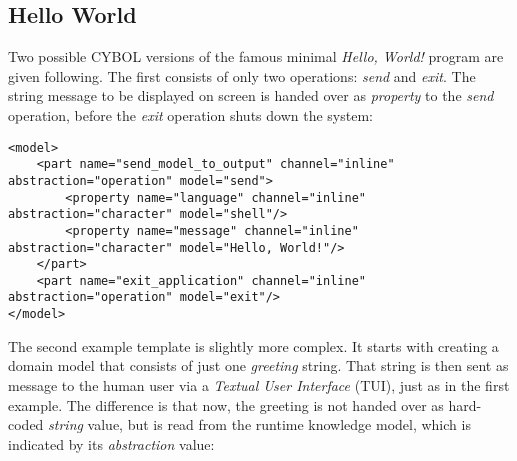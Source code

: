 %
%
%
%
%
%

\subsection{Hello World}
\label{hello_world_heading}

Two possible CYBOL versions of the famous minimal \emph{Hello, World!} program
are given following. The first consists of only two operations: \emph{send} and
\emph{exit}. The string message to be displayed on screen is handed over as
\emph{property} to the \emph{send} operation, before the \emph{exit} operation
shuts down the system:

\begin{scriptsize}
    \begin{verbatim}
<model>
    <part name="send_model_to_output" channel="inline" abstraction="operation" model="send">
        <property name="language" channel="inline" abstraction="character" model="shell"/>
        <property name="message" channel="inline" abstraction="character" model="Hello, World!"/>
    </part>
    <part name="exit_application" channel="inline" abstraction="operation" model="exit"/>
</model>
    \end{verbatim}
\end{scriptsize}

The second example template is slightly more complex. It starts with creating a
domain model that consists of just one \emph{greeting} string. That string is
then sent as message to the human user via a \emph{Textual User Interface}
(TUI), just as in the first example. The difference is that now, the greeting
is not handed over as hard-coded \emph{string} value, but is read from the
runtime knowledge model, which is indicated by its \emph{abstraction} value:

